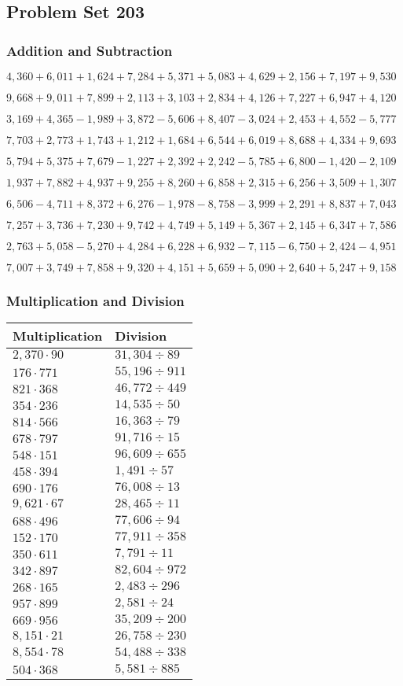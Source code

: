 \hypertarget{problem-set-203}{%
\subsection{Problem Set 203}\label{problem-set-203}}

\hypertarget{addition-and-subtraction}{%
\subsubsection{Addition and
Subtraction}\label{addition-and-subtraction}}

\(4,360+6,011+1,624+7,284+5,371+5,083+4,629+2,156+7,197+9,530\)

\(9,668+9,011+7,899+2,113+3,103+2,834+4,126+7,227+6,947+4,120\)

\(3,169+4,365-1,989+3,872-5,606+8,407-3,024+2,453+4,552-5,777\)

\(7,703+2,773+1,743+1,212+1,684+6,544+6,019+8,688+4,334+9,693\)

\(5,794+5,375+7,679-1,227+2,392+2,242-5,785+6,800-1,420-2,109\)

\(1,937+7,882+4,937+9,255+8,260+6,858+2,315+6,256+3,509+1,307\)

\(6,506-4,711+8,372+6,276-1,978-8,758-3,999+2,291+8,837+7,043\)

\(7,257+3,736+7,230+9,742+4,749+5,149+5,367+2,145+6,347+7,586\)

\(2,763+5,058-5,270+4,284+6,228+6,932-7,115-6,750+2,424-4,951\)

\(7,007+3,749+7,858+9,320+4,151+5,659+5,090+2,640+5,247+9,158\)

\hypertarget{multiplication-and-division}{%
\subsubsection{Multiplication and
Division}\label{multiplication-and-division}}

\begin{longtable}[]{@{}ll@{}}
\toprule
Multiplication & Division\tabularnewline
\midrule
\endhead
\(2,370\cdot90\) & \(31,304÷89\)\tabularnewline
\(176\cdot771\) & \(55,196÷911\)\tabularnewline
\(821\cdot368\) & \(46,772÷449\)\tabularnewline
\(354\cdot236\) & \(14,535÷50\)\tabularnewline
\(814\cdot566\) & \(16,363÷79\)\tabularnewline
\(678\cdot797\) & \(91,716÷15\)\tabularnewline
\(548\cdot151\) & \(96,609÷655\)\tabularnewline
\(458\cdot394\) & \(1,491÷57\)\tabularnewline
\(690\cdot176\) & \(76,008÷13\)\tabularnewline
\(9,621\cdot67\) & \(28,465÷11\)\tabularnewline
\(688\cdot496\) & \(77,606÷94\)\tabularnewline
\(152\cdot170\) & \(77,911÷358\)\tabularnewline
\(350\cdot611\) & \(7,791÷11\)\tabularnewline
\(342\cdot897\) & \(82,604÷972\)\tabularnewline
\(268\cdot165\) & \(2,483÷296\)\tabularnewline
\(957\cdot899\) & \(2,581÷24\)\tabularnewline
\(669\cdot956\) & \(35,209÷200\)\tabularnewline
\(8,151\cdot21\) & \(26,758÷230\)\tabularnewline
\(8,554\cdot78\) & \(54,488÷338\)\tabularnewline
\(504\cdot368\) & \(5,581÷885\)\tabularnewline
\bottomrule
\end{longtable}
